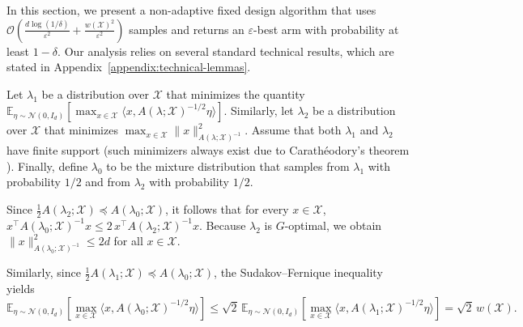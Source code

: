 In this section, we present a non-adaptive  fixed design algorithm that uses
$\mathcal{O}\!\left(\frac{d\log(1/\delta)}{\varepsilon^2}+\frac{w(\mathcal{X})^2}{\varepsilon^2}\right)$
samples and returns an $\varepsilon$-best arm with probability at least $1-\delta$.
Our analysis relies on several standard technical results, which are stated in
Appendix~\ref{appendix:technical-lemmas}.



Let $\lambda_1$ be a distribution over $\mathcal{X}$ that minimizes the quantity
$\mathbb{E}_{\eta\sim\mathcal{N}(0,I_d)}\!\left[\max_{x\in\mathcal{X}}\langle x, A(\lambda;\mathcal{X})^{-1/2}\eta\rangle\right]$.
Similarly, let $\lambda_2$ be a distribution over $\mathcal{X}$ that minimizes
$\max_{x\in\mathcal{X}} \|x\|^2_{A(\lambda;\mathcal{X})^{-1}}$.
Assume that both $\lambda_1$ and $\lambda_2$ have finite support (such minimizers always exist due to Carath\'eodory's theorem ).
Finally, define $\lambda_0$ to be the mixture distribution that samples from $\lambda_1$ with probability $1/2$ and from $\lambda_2$ with probability $1/2$.




Since $\tfrac{1}{2}A(\lambda_2;\mathcal{X}) \preceq A(\lambda_0;\mathcal{X})$, it follows that for every $x\in\mathcal{X}$,
$x^\top A(\lambda_0;\mathcal{X})^{-1}x \le 2\,x^\top A(\lambda_2;\mathcal{X})^{-1}x$.
Because $\lambda_2$ is $G$-optimal, we obtain $\|x\|^2_{A(\lambda_0;\mathcal{X})^{-1}} \le 2d$ for all $x\in\mathcal{X}$.

Similarly, since $\tfrac{1}{2}A(\lambda_1;\mathcal{X}) \preceq A(\lambda_0;\mathcal{X})$, the Sudakov--Fernique inequality yields
\[
\mathbb{E}_{\eta\sim\mathcal{N}(0,I_d)}\!\left[\max_{x\in\mathcal{X}}\langle x, A(\lambda_0;\mathcal{X})^{-1/2}\eta\rangle\right]
\le \sqrt{2}\,
\mathbb{E}_{\eta\sim\mathcal{N}(0,I_d)}\!\left[\max_{x\in\mathcal{X}}\langle x, A(\lambda_1;\mathcal{X})^{-1/2}\eta\rangle\right]
= \sqrt{2}\, w(\mathcal{X}).
\]




